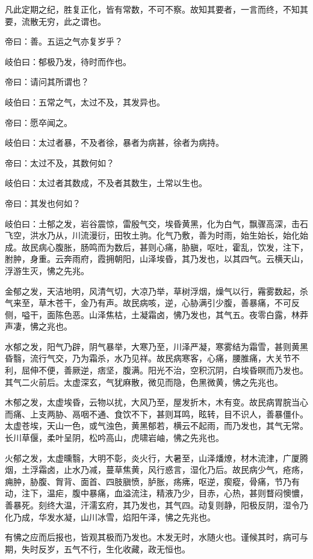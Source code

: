 \documentclass{article}%
\begin{document}
凡此定期之纪，胜复正化，皆有常数，不可不察。故知其要者，一言而终，不知其要，流散无穷，此之谓也。

帝曰：善。五运之气亦复岁乎？

岐伯曰：郁极乃发，待时而作也。

帝曰：请问其所谓也？

岐伯曰：五常之气，太过不及，其发异也。

帝曰：愿卒闻之。

岐伯曰：太过者暴，不及者徐，暴者为病甚，徐者为病持。

帝曰：太过不及，其数何如？

岐伯曰：太过者其数成，不及者其数生，土常以生也。

帝曰：其发也何如？

岐伯曰：土郁之发，岩谷震惊，雷殷气交，埃昏黄黑，化为白气，飘骤高深，击石飞空，洪水乃从，川流漫衍，田牧土驹。化气乃敷，善为时雨，始生始长，始化始成。故民病心腹胀，肠鸣而为数后，甚则心痛，胁䐜，呕吐，霍乱，饮发，注下，胕肿，身重。云奔雨府，霞拥朝阳，山泽埃昏，其乃发也，以其四气。云横天山，浮游生灭，怫之先兆。

金郁之发，天洁地明，风清气切，大凉乃举，草树浮烟，燥气以行，霿雾数起，杀气来至，草木苍干，金乃有声。故民病咳，逆，心胁满引少腹，善暴痛，不可反侧，嗌干，面陈色恶。山泽焦枯，土凝霜卤，怫乃发也，其气五。夜零白露，林莽声凄，怫之兆也。

水郁之发，阳气乃辟，阴气暴举，大寒乃至，川泽严凝，寒雾结为霜雪，甚则黄黑昏翳，流行气交，乃为霜杀，水乃见祥。故民病寒客，心痛，腰脽痛，大关节不利，屈伸不便，善厥逆，痞坚，腹满。阳光不治，空积沉阴，白埃昏暝而乃发也。其气二火前后。太虚深玄，气犹麻散，微见而隐，色黑微黄，怫之先兆也。

木郁之发，太虚埃昏，云物以扰，大风乃至，屋发折木，木有变。故民病胃脘当心而痛、上支两胁、鬲咽不通、食饮不下，甚则耳鸣，眩转，目不识人，善暴僵仆。太虚苍埃，天山一色，或气浊色，黄黑郁若，横云不起雨，而乃发也，其气无常。长川草偃，柔叶呈阴，松吟高山，虎啸岩岫，怫之先兆也。

火郁之发，太虚曛翳，大明不彰，炎火行，大暑至，山泽燔燎，材木流津，广厦腾烟，土浮霜卤，止水乃减，蔓草焦黄，风行惑言，湿化乃后。故民病少气，疮疡，痈肿，胁腹、胷背、面首、四肢䐜愤，胪胀，疡疿，呕逆，瘈瘲，骨痛，节乃有动，注下，温疟，腹中暴痛，血溢流注，精液乃少，目赤，心热，甚则瞀闷懊憹，善暴死。刻终大温，汗濡玄府，其乃发也，其气四。动复则静，阳极反阴，湿令乃化乃成，华发水凝，山川冰雪，焰阳午泽，怫之先兆也。

有怫之应而后报也，皆观其极而乃发也。木发无时，水随火也。谨候其时，病可与期，失时反岁，五气不行，生化收藏，政无恒也。
\end{document}
